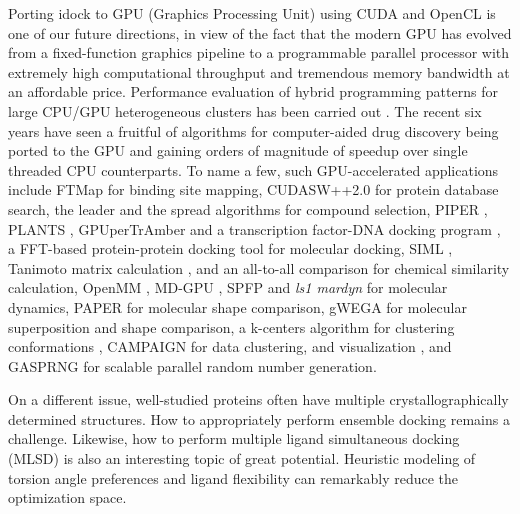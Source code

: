 Porting idock to GPU (Graphics Processing Unit) using CUDA and OpenCL is one of our future directions, in view of the fact that the modern GPU has evolved from a fixed-function graphics pipeline to a programmable parallel processor with extremely high computational throughput and tremendous memory bandwidth at an affordable price. Performance evaluation of hybrid programming patterns for large CPU/GPU heterogeneous clusters has been carried out \citep{1035}. The recent six years have seen a fruitful of algorithms for computer-aided drug discovery being ported to the GPU and gaining orders of magnitude of speedup over single threaded CPU counterparts. To name a few, such GPU-accelerated applications include FTMap \citep{722} for binding site mapping, CUDASW++2.0 \citep{189} for protein database search, the leader and the spread algorithms \citep{750} for compound selection, PIPER \citep{723}, PLANTS \citep{779}, GPUperTrAmber \citep{1270} and a transcription factor-DNA docking program \citep{1267,1266}, a FFT-based protein-protein docking tool \citep{242,652} for molecular docking, SIML \citep{726}, Tanimoto matrix calculation \citep{881}, and an all-to-all comparison \citep{1532} for chemical similarity calculation, OpenMM \citep{373}, MD-GPU \citep{374}, SPFP \citep{1261} and \textit{ls1 mardyn} \citep{1488} for molecular dynamics, PAPER \citep{491} for molecular shape comparison, gWEGA \citep{1388} for molecular superposition and shape comparison, a k-centers algorithm for clustering conformations \citep{1275}, CAMPAIGN \citep{932} for data clustering, and visualization \citep{986}, and GASPRNG \citep{1401} for scalable parallel random number generation.

On a different issue, well-studied proteins often have multiple crystallographically determined structures. How to appropriately perform ensemble docking \citep{966,547,1128} remains a challenge. Likewise, how to perform multiple ligand simultaneous docking (MLSD) \citep{869,1292} is also an interesting topic of great potential. Heuristic modeling of torsion angle preferences \citep{1306,1537} and ligand flexibility \citep{1533} can remarkably reduce the optimization space.


\chapterend
